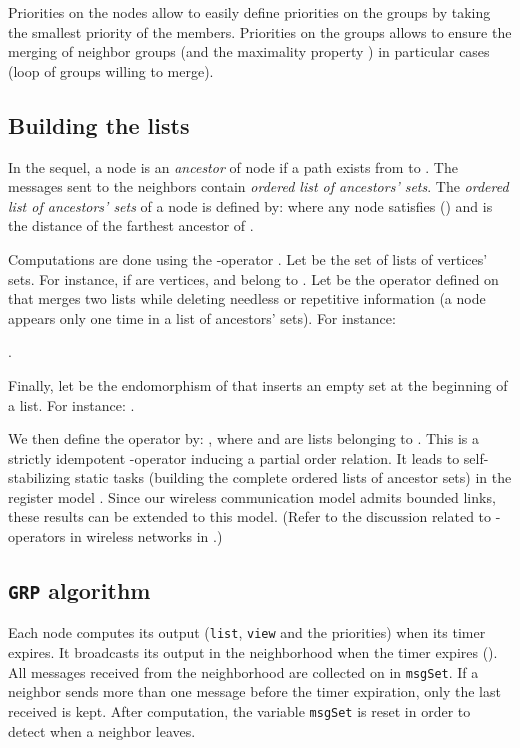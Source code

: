 \documentclass[11pt,english]{article}
\begin{document}
Priorities on the nodes allow to easily define priorities on the groups by
taking the smallest priority of the members.  Priorities on the groups allows to
ensure the merging of neighbor groups (and the maximality property ) in
particular cases (loop of groups willing to merge).



\subsection{Building the lists}\label{s:ant}
In the sequel, a node  is an {\em ancestor} of node  if a path exists from  to . 
The messages sent to the neighbors contain \emph{ordered list of ancestors'
  sets}.  The \emph{ordered list of ancestors' sets} of a node  is defined
by:
    where any node
 satisfies  () and  is the distance
of the farthest ancestor of .

Computations are done using the -operator 
\cite{JACIC06,DT03,SSS07}.
Let  be the set of lists of vertices' sets. For instance, if
 are vertices,  and  belong to .
Let  be the operator defined on  that merges two lists while
deleting needless or repetitive information (a node appears only one time in a
list of ancestors' sets).  For instance: \newline
\noindent

\newline \noindent
.

Finally, let  be the endomorphism of  that inserts an empty set at
the beginning of a list. For instance: \newline \noindent
.

We then define the operator  by: , where  and  are lists belonging to . This
is a strictly idempotent -operator \cite{SSS07} inducing a partial order
relation. It leads to self-stabilizing static tasks (building the complete
ordered lists of ancestor sets) in the register model \cite{DT03}.
Since our wireless communication model admits bounded links, these results can
be extended to this model. (Refer to the discussion related to -operators in
wireless networks in \cite{JACIC06}.)


\subsection{\texttt{GRP} algorithm}
 

Each node  computes its output (\texttt{list}, \texttt{view} and the
priorities) when its timer  expires. It broadcasts its output in the
neighborhood when the timer  expires ().
All messages received from the neighborhood are collected on  in
\texttt{msgSet}. If a neighbor sends more than one message before the timer
expiration, only the last received is kept.
After computation, the variable \texttt{msgSet} is reset in order to detect
when a neighbor leaves.
\end{document}
